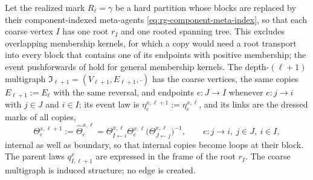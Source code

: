 Let the realized mark $R_\ell=\gamma$ be a hard partition whose blocks are replaced by
their component-indexed meta-agents \eqref{eq:rg-component-meta-index}, so that each
coarse vertex $I$ has one root $r_I$ and one rooted spanning tree. This excludes
overlapping membership kernels, for which a copy would need a root transport into
every block that contains one of its endpoints with positive membership; the event
pushforwards of  hold for general membership
kernels. The depth-$(\ell+1)$ multigraph $\mathfrak I_{\ell+1}=(V_{\ell+1},E_{\ell+1},\bar{\ })$
has the coarse vertices, the same copies $E_{\ell+1}:=E_\ell$ with the same reversal,
and endpoints $e:J\to I$ whenever $e:j\to i$ with $j\in J$ and $i\in I$; its event law
is $\eta^{x,\ell+1}_e:=\eta^{x,\ell}_e$, and its links are the dressed marks of all
copies,
\begin{equation}
\Theta^{x,\ell+1}_e
:=\widehat\Theta^{x,\ell}_e
=\Theta^{x,\ell}_{I\leftarrow i}\Theta^{x,\ell}_e\bigl(\Theta^{x,\ell}_{J\leftarrow j}\bigr)^{-1},
\qquad e:j\to i,\ j\in J,\ i\in I,
\label{eq:full-graph-coarse-links}
\end{equation}
internal as well as boundary, so that internal copies become loops at their block. The
parent laws $q^x_{I,\ell+1}$ are expressed in the frame of the root $r_I$. The coarse
multigraph is induced structure; no edge is created.

